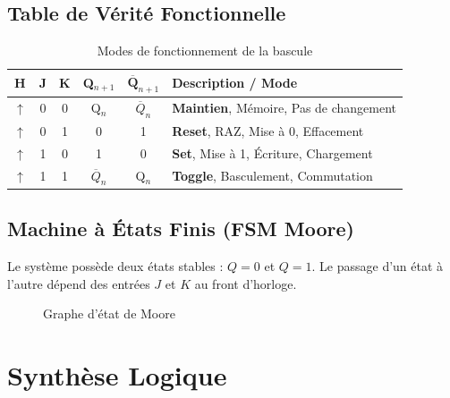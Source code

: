 \documentclass[12pt, a4paper]{article}
\newcommand{\motcle}[1]{\textcolor{HighlightRed}{\textbf{#1}}}
\begin{document}
\subsection{Table de Vérité Fonctionnelle}
\begin{table}[H]
\centering
\caption{Modes de fonctionnement de la bascule}
\vspace{0.2cm}
\begin{tabular}{|c|c|c|c|c|l|}
\hline
\rowcolor{EnsaBlue!20} \textbf{H} & \textbf{J} & \textbf{K} & \textbf{Q$_{n+1}$} & \textbf{$\overline{\textbf{Q}}_{n+1}$} & \textbf{Description / Mode} \\ \hline
$\uparrow$ & 0 & 0 & Q$_n$ & $\overline{Q}_n$ & \motcle{Maintien}, Mémoire, Pas de changement \\ \hline
$\uparrow$ & 0 & 1 & 0 & 1 & \motcle{Reset}, RAZ, Mise à 0, Effacement \\ \hline
$\uparrow$ & 1 & 0 & 1 & 0 & \motcle{Set}, Mise à 1, Écriture, Chargement \\ \hline
$\uparrow$ & 1 & 1 & $\overline{Q}_n$ & Q$_n$ & \motcle{Toggle}, Basculement, Commutation \\ \hline
\end{tabular}
\end{table}

\subsection{Machine à États Finis (FSM Moore)}
Le système possède deux états stables : $Q=0$ et $Q=1$. Le passage d'un état à l'autre dépend des entrées $J$ et $K$ au front d'horloge.

\begin{figure}[H]
\centering
{}
\caption{Graphe d'état de Moore}
\end{figure}

\section{Synthèse Logique}
\end{document}
